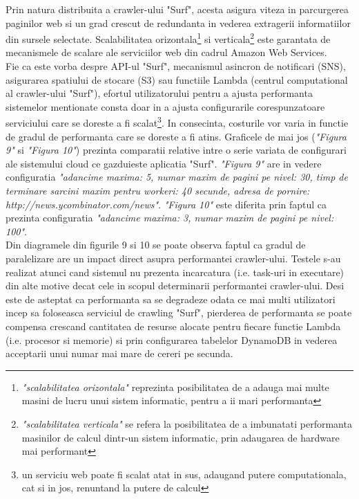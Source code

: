 Prin natura distribuita a crawler-ului "Surf", acesta asigura viteza in parcurgerea paginilor web si un grad crescut de redundanta in vederea extragerii informatiilor din sursele selectate. Scalabilitatea orizontala\footnote{\textit{"scalabilitatea orizontala"} reprezinta posibilitatea de a adauga mai multe masini de lucru unui sistem informatic, pentru a ii mari performanta} si verticala\footnote{\textit{"scalabilitatea verticala"} se refera la posibilitatea de a imbunatati performanta masinilor de calcul dintr-un sistem informatic, prin adaugarea de hardware mai performant} este garantata de mecanismele de scalare ale serviciilor web din cadrul Amazon Web Services.
\\ 

Fie ca este vorba despre API-ul "Surf", mecanismul asincron de notificari (SNS), asigurarea spatiului de stocare (S3) sau functiile Lambda (centrul computational al crawler-ului "Surf"), efortul utilizatorului pentru a ajusta performanta sistemelor mentionate consta doar in a ajusta configurarile corespunzatoare serviciului care se doreste a fi scalat\footnote{un serviciu web poate fi scalat atat in sus, adaugand putere computationala, cat si in jos, renuntand la putere de calcul}. In consecinta, costurile vor varia in functie de gradul de performanta care se doreste a fi atins. Graficele de mai jos (\textit{"Figura 9"} si \textit{"Figura 10"}) prezinta comparatii relative intre o serie variata de configurari ale sistemului cloud ce gazduieste aplicatia "Surf". \textit{"Figura 9"} are in vedere configuratia \textit{"adancime maxima: 5, numar maxim de pagini pe nivel: 30, timp de terminare sarcini maxim pentru workeri: 40 secunde, adresa de pornire: http://news.ycombinator.com/news"}. \textit{"Figura 10"} este diferita prin faptul ca prezinta configuratia \textit{"adancime maxima: 3, numar maxim de pagini pe nivel: 100"}.
\\

Din diagramele din figurile 9 si 10 se poate observa faptul ca gradul de paralelizare are un impact direct asupra performantei crawler-ului. Testele s-au realizat atunci cand sistemul nu prezenta incarcatura (i.e. task-uri in executare) din alte motive decat cele in scopul determinarii performantei crawler-ului. Desi este de asteptat ca performanta sa se degradeze odata ce mai multi utilizatori incep sa foloseasca serviciul de crawling "Surf", pierderea de performanta se poate compensa crescand cantitatea de resurse alocate pentru fiecare functie Lambda (i.e. procesor si memorie) si prin configurarea tabelelor DynamoDB in vederea acceptarii unui numar mai mare de cereri pe secunda.

